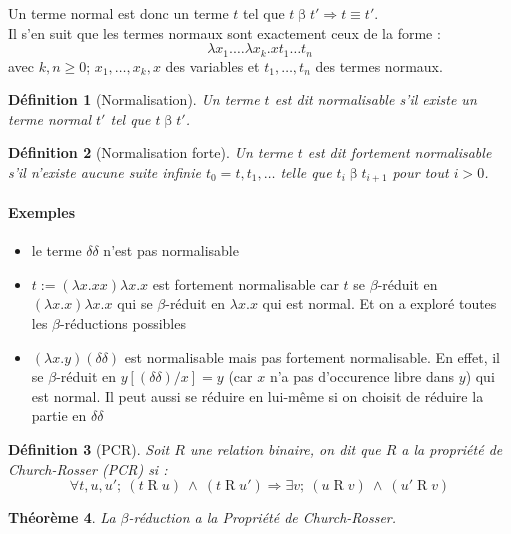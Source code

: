 \documentclass[a4paper,12pt]{article}
\theoremstyle{plain}
\newtheorem{theo}{Théorème}[subsection]
\newtheorem{defi}[theo]{Définition}
\begin{document}
Un terme normal est donc un terme $t$ tel que $t \mathbin{\beta} t' \Rightarrow t \equiv t'$.\\
Il s'en suit que les termes normaux sont exactement ceux de la forme :
$$\lambda x_1. \dots \lambda x_k. xt_1 \dots t_n$$
avec $k,n \geq 0$; $x_1, \dots, x_k, x$ des variables et $t_1, \dots, t_n$ des termes normaux.

\begin{defi}[Normalisation]
Un terme $t$ est dit normalisable s'il existe un terme normal $t'$ tel que $t  \mathbin{\beta} t'$.
\end{defi}

\begin{defi}[Normalisation forte]
\label{normalisation forte}
Un terme $t$ est dit fortement normalisable s'il n'existe aucune suite infinie $t_0 = t, t_1, \dots$ telle que $t_i \mathbin{\beta} t_{i+1}$ pour tout $i > 0$.
\end{defi}

\paragraph{Exemples}
\begin{itemize}
\setlength\itemsep{ -1.5 em}
\item le terme $\delta \delta$ n'est pas normalisable\\
\item $t := (\lambda x.xx) \lambda x.x$ est fortement normalisable car $t$ se $\beta$-réduit en $(\lambda x.x) \lambda x.x$ qui se $\beta$-réduit en $ \lambda x.x $ qui est normal. Et on a exploré toutes les $\beta$-réductions possibles\\
\item $(\lambda x.y) (\delta \delta)$ est normalisable mais pas fortement normalisable. En effet, il se $\beta$-réduit en $y[(\delta \delta)/x] = y$ (car $x$ n'a pas d'occurence libre dans $y$) qui est normal. Il peut aussi se réduire en lui-même si on choisit de réduire la partie en $\delta \delta$
\end{itemize}

\begin{defi}[PCR]
\label{PCR}
Soit $R$ une relation binaire, on dit que $R$ a la propriété de Church-Rosser (PCR) si :
$$\forall t,u,u'; \ (t \mathbin{R} u) \ \land \ (t \mathbin{R} u' ) \Rightarrow\exists v; \ (u \mathbin{R} v) \ \land \ (u' \mathbin{R} v)$$
\end{defi}

\begin{theo}
La $\beta$-réduction a la Propriété de Church-Rosser.
\end{theo}
\end{document}
